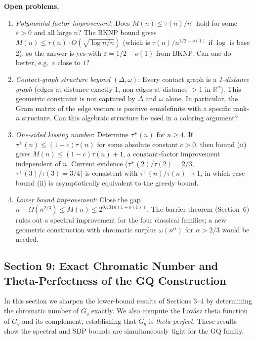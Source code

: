 \documentclass{article}
\theoremstyle{definition}
\begin{document}
\medskip
\textbf{Open problems.}
\begin{enumerate}
\item[\textup{(1)}] \emph{Polynomial factor improvement}: Does $M(n)\le\tau(n)/n^{\varepsilon}$ hold for some $\varepsilon>0$ and all large $n$?  The BKNP bound gives $M(n)\le\tau(n)\cdot O(\sqrt{\log n/n})$ (which is $\tau(n)/n^{1/2-o(1)}$ if $\log$ is base 2), so the answer is yes with $\varepsilon = 1/2 - o(1)$ from BKNP.  Can one do better, e.g.\ $\varepsilon$ close to $1$?

\item[\textup{(2)}] \emph{Contact-graph structure beyond $(\Delta,\omega)$}: Every contact graph is a \emph{1-distance graph} (edges at distance exactly 1, non-edges at distance $>1$ in $\mathbb{R}^n$).  This geometric constraint is not captured by $\Delta$ and $\omega$ alone.  In particular, the Gram matrix of the edge vectors is positive semidefinite with a specific rank-$n$ structure.  Can this algebraic structure be used in a coloring argument?

\item[\textup{(3)}] \emph{One-sided kissing number}: Determine $\tau^+(n)$ for $n\ge 4$.  If $\tau^+(n)\le(1-c)\tau(n)$ for some absolute constant $c>0$, then bound (ii) gives $M(n)\le(1-c)\tau(n)+1$, a constant-factor improvement independent of $n$.  Current evidence ($\tau^+(2)/\tau(2)=2/3$, $\tau^+(3)/\tau(3)=3/4$) is consistent with $\tau^+(n)/\tau(n)\to 1$, in which case bound (ii) is asymptotically equivalent to the greedy bound.

\item[\textup{(4)}] \emph{Lower bound improvement}: Close the gap $n+\Omega(n^{2/3})\le M(n)\le 2^{0.401n(1+o(1))}$.  The barrier theorem (Section~6) rules out a spectral improvement for the four classical families; a new geometric construction with chromatic surplus $\omega(n^\alpha)$ for $\alpha>2/3$ would be needed.
\end{enumerate}

\subsection*{Section 9: Exact Chromatic Number and Theta-Perfectness of the GQ Construction}

In this section we sharpen the lower-bound results of Sections 3--4 by determining the chromatic number of $G_q$ exactly.  We also compute the Lov\'asz theta function of $G_q$ and its complement, establishing that $G_q$ is \emph{theta-perfect}.  These results show the spectral and SDP bounds are simultaneously tight for the GQ family.
\end{document}
